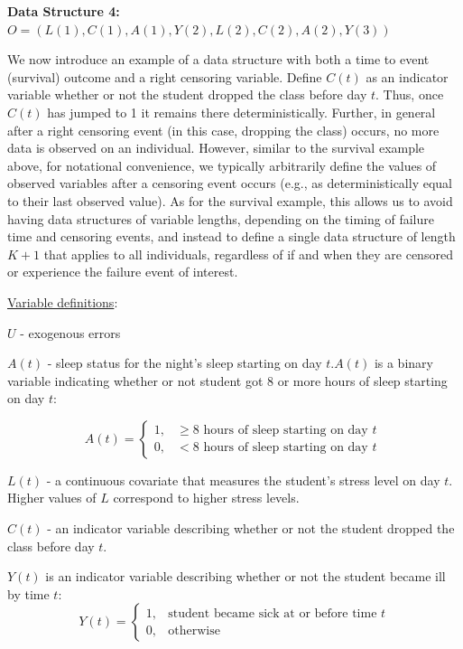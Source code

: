\documentclass[answers]{exam}
\newenvironment{packed_item}{
\begin{itemize}
 \setlength{\itemsep}{0pt}
  \setlength{\parskip}{0pt}
  \setlength{\parsep}{0pt}
}{\end{itemize}}
\begin{document}
\noindent\large\textbf{Data Structure 4: $O = (L(1), C(1), A(1), Y(2), L(2), C(2), A(2), Y(3))$}
\normalsize


We now introduce an example of a data structure with both a time to event (survival) outcome and a right censoring variable. Define $C(t)$ as an indicator variable whether or not the student dropped the class before day $t$. Thus, once $C(t)$ has jumped to 1 it remains there deterministically. Further, in general after a right censoring event (in this case, dropping the class) occurs, no more data is observed on an individual. However, similar to the survival example above, for notational convenience, we typically arbitrarily define the values of observed variables after a censoring event occurs (e.g., as deterministically equal to their last observed value). As for the survival example, this allows us to avoid having data structures of variable lengths, depending on the timing of failure time and censoring events, and instead to define a single data structure of length $K+1$ that applies to all individuals, regardless of if and when they are censored or experience the failure event of interest.

\underline{Variable definitions}:
\begin{packed_item}
\item[] $U$ - exogenous errors
\item[] $A(t)$ - sleep status for the night's sleep starting on day $t$.$A(t)$ is a binary variable indicating whether or not student got 8 or more hours of sleep starting on day $t$:

  \begin{equation*}
    A(t)=
    \begin{cases}
      1, & \geq 8 \text{ hours of sleep starting on day $t$}\ \\
      0, & < 8 \text{ hours of sleep starting on day $t$}
    \end{cases}
  \end{equation*}


  
\item[] $L(t)$ - a continuous covariate that measures the student's stress level on day $t$. Higher values of $L$ correspond to higher stress levels.
\item[] $C(t)$ - an indicator variable describing whether or not the student dropped the class before day $t$. 
\item[] $Y(t)$ is an indicator variable describing whether or not the student became ill by time $t$:
  \begin{equation*}
    Y(t)=
    \begin{cases}
      1, & \text{student became sick at or before time $t$} \\
      0, & \text{otherwise}
    \end{cases}
  \end{equation*}
\end{packed_item}
\end{document}

